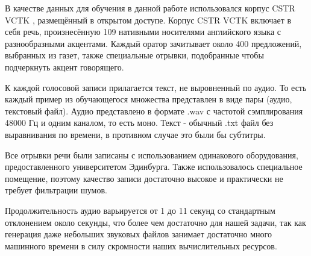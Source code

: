 \documentclass[../diploma.tex]{subfiles}
\begin{document}
В качестве данных для обучения в данной работе использовался корпус CSTR VCTK \cite{online:vctk}, размещённый в открытом доступе.
Корпус CSTR VCTK включает в себя речь, произнесённую 109 нативными носителями английского языка с разнообразными акцентами. 
Каждый оратор зачитывает около 400 предложений, выбранных из газет, также специальные отрывки, подобранные чтобы подчеркнуть акцент говорящего. 

К каждой голосовой записи прилагается текст, не выровненный по аудио. То есть каждый пример из обучающегося множества представлен в виде пары (аудио, текстовый файл). 
Аудио представлено в формате .wav с частотой сэмплирования 48000 Гц и одним каналом, то есть моно. Текст - обычный .txt файл без выравнивания по времени, в противном случае это были бы субтитры.

Все отрывки речи были записаны с использованием одинакового оборудования, предоставленного университетом Эдинбурга. Также использовалось специальное помещение, поэтому качество записи достаточно высокое и практически не требует фильтрации шумов.

Продолжительность аудио варьируется от 1 до 11 секунд со стандартным отклонением около секунды, что более чем достаточно для нашей задачи, так как генерация даже небольших звуковых файлов занимает достаточно много машинного времени в силу скромности наших вычислительных ресурсов.
\end{document}
